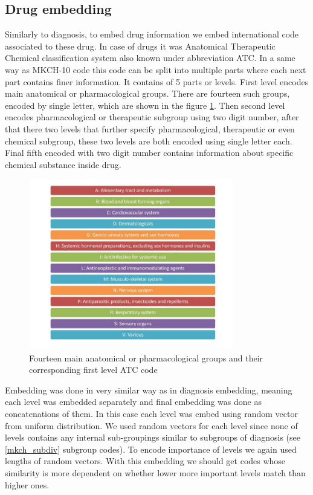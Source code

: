 \subsection{Drug embedding}
\label{drugEmb}

Similarly to diagnosis, to embed drug information we embed international code associated to these drug. In case of drugs it was Anatomical Therapeutic Chemical classification system also known under abbreviation ATC. In a same way as MKCH-10 code this code can be split into multiple parts where each next part contains finer information. It contains of 5 parts or levels. First level encodes main anatomical or pharmacological groups. There are fourteen such groups, encoded by single letter, which are shown in the figure \ref{fig:atc_l1}. Then second level encodes pharmacological or therapeutic subgroup using two digit number, after that there two levels that further specify pharmacological, therapeutic or even chemical subgroup, these two levels are both encoded using single letter each. Final fifth encoded with two digit number contains information about specific chemical substance inside drug.

\begin{figure}[!h]
	\centering
	
	\includegraphics[width=0.8\textwidth]{images/atc_l1_classification_who.jpg}
	
	\caption{Fourteen main anatomical or pharmacological groups and their corresponding first level ATC code \cite{atc_who}}
	\label{fig:atc_l1}
\end{figure}

Embedding was done in very similar way as in diagnosis embedding, meaning each level was embedded separately and final embedding was done as concatenations of them. In this case each level was embed using random vector from uniform distribution. We used random vectors for each level since none of levels contains any internal sub-groupings similar to subgroups of diagnosis (see \ref{mkch_subdiv} subgroup codes). To encode importance of levels we again used lengths of random vectors. With this embedding we should get codes whose similarity is more dependent on whether lower more important levels match than higher ones.
\\


